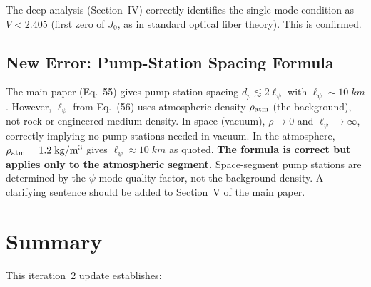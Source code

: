 \documentclass[aps,prd,twocolumn,superscriptaddress]{revtex4-2}
\begin{document}
The deep analysis (Section~IV) correctly identifies the single-mode
condition as $V < 2.405$ (first zero of $J_0$, as in standard optical
fiber theory).  This is confirmed.

\subsection{New Error: Pump-Station Spacing Formula}

The main paper (Eq.~55) gives pump-station spacing
$d_p \lesssim 2\ell_\psi$ with $\ell_\psi \sim 10\;\si{km}$.
However, $\ell_\psi$ from Eq.~(56) uses atmospheric density
$\rho_{\rm atm}$ (the background), not rock or engineered medium density.
In space (vacuum), $\rho \to 0$ and $\ell_\psi \to \infty$, correctly
implying no pump stations needed in vacuum.  In the atmosphere,
$\rho_{\rm atm} = 1.2\;\si{kg/m^3}$ gives $\ell_\psi \approx 10\;\si{km}$
as quoted.  \textbf{The formula is correct but applies only to the
atmospheric segment.}  Space-segment pump stations are determined
by the $\psi$-mode quality factor, not the background density.  A
clarifying sentence should be added to Section~V of the main paper.

\section{Summary}
\label{sec:summary}

This iteration~2 update establishes:
\end{document}
